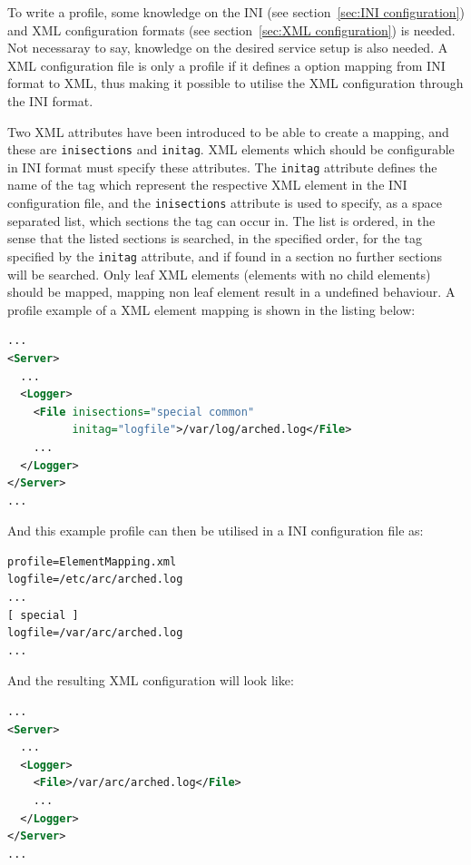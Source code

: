 \documentclass{article}
\begin{document}
To write a profile, some knowledge on the INI (see
section~\ref{sec:INI configuration}) and XML configuration formats (see
section~\ref{sec:XML configuration}) is needed. Not necessaray to say, knowledge
on the desired service setup is also needed. A XML configuration file is only a
profile if it defines a option mapping from INI format to XML, thus making it
possible to utilise the XML configuration through the INI format.

Two XML attributes have been introduced to be able to create a mapping, and
these are \texttt{inisections} and \texttt{initag}. XML elements which should be
configurable in INI format must specify these attributes. The \texttt{initag}
attribute defines the name of the tag which represent the respective XML element
in the INI configuration file, and the \texttt{inisections} attribute is used to
specify, as a space separated list, which sections the tag can occur in. The
list is ordered, in the sense that the listed sections is searched, in the
specified order, for the tag specified by the \texttt{initag} attribute, and if
found in a section no further sections will be searched. Only leaf XML elements
(elements with no child elements) should be mapped, mapping non leaf element
result in a undefined behaviour. A profile example of a XML element mapping is
shown in the listing below:
\begin{lstlisting}[language=xml,title=ElementMapping.xml]
...
<Server>
  ...
  <Logger>
    <File inisections="special common"
          initag="logfile">/var/log/arched.log</File>
    ...
  </Logger>
</Server>
...
\end{lstlisting}
And this example profile can then be utilised in a INI configuration file as:
\begin{lstlisting}[language=xml,title=ElementMapping.ini]
profile=ElementMapping.xml
logfile=/etc/arc/arched.log
...
[ special ]
logfile=/var/arc/arched.log
...
\end{lstlisting}
And the resulting XML configuration will look like:
\begin{lstlisting}[language=xml]
...
<Server>
  ...
  <Logger>
    <File>/var/arc/arched.log</File>
    ...
  </Logger>
</Server>
...
\end{lstlisting}
\end{document}
